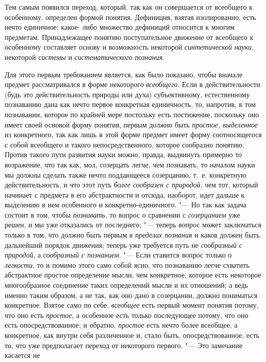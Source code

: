 Тем самым появился переход, который, так как он совершается от
всеобщего к особенному, определен формой понятия. Дефиниция, взятая
изолированно, есть нечто единичное; какое- либо множество дефиниций
относится к многим предметам. Принадлежащее понятию поступательное движение
от всеобщего к особенному составляет основу и возможность некоторой
{\em синтетической науки},
некоторой {\em системы}
и {\em систематического
познания}.

Для этого первым требованием является, как было показано,
чтобы вначале предмет рассматривался в форме некоторого
{\em всеобщего}. Если в
действительности (будь это действительность природы или духа)
субъективному, естественному познаванию дана как нечто первое конкретная
единичность, то, напротив, в том познавании, которое по крайней мере
постольку есть постижение, поскольку оно имеет своей основой форму понятия,
первым должно быть {\em простое,
выделенное} из конкретного, так как лишь в этой форме
предмет имеет форму соотносящегося с собой всеобщего и такого
непосредственного, которое сообразно понятию. Против такого пути развития
науки можно, правда, выдвинуть примерно то возражение, что так как, мол,
созерцать легче, чем познавать, то началом науки мы должны
сделать также нечто поддающееся созерцанию, т.~е. конкретную
действительность, и что этот путь
{\em более сообразен с природой},
чем тот, который начинает с предмета в его абстрактности и
отсюда, наоборот, идет дальше к выделению в нем особенного и
конкретно-единичного. "--- Но так как задача состоит в том,
чтобы {\em познавать}, то
вопрос о сравнении с {\em созерцанием}
уже решен, и мы уже отказались от последнего;
"--- теперь вопрос может заключаться только в том, что должно
быть первым {\em в пределах познания}
и каков должен быть дальнейший порядок движения; теперь уже
требуется путь не {\em сообразный с
природой}, а{\em
сообразный с познанием}. "--- Если ставится
вопрос только о {\em легкости},
то и помимо этого само собой ясно, что познаванию легче
схватить абстрактное простое определение мысли, чем конкретное, которое
есть некоторое многообразное соединение таких определений мысли и их
отношений; а ведь именно таким образом, а не так, как оно дано в
созерцании, должно пониматься конкретное. Взятое само по себе,
{\em всеобщее} есть
первый момент понятия потому, что оно есть
{\em простое}, а
особенное есть только последующее потому, что оно есть опосредствованное; и
обратно, {\em простое}
есть нечто более всеобщее, а конкретное, как внутри себя
различенное и, стало быть, опосредствованное, есть то, что уже предполагает
переход от некоторого первого. "--- Это замечание касается не

